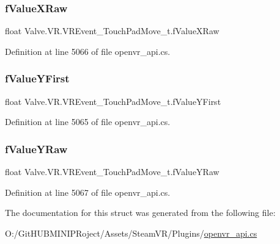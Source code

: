 \subsubsection{\texorpdfstring{fValueXRaw}{fValueXRaw}}
{\footnotesize\ttfamily float Valve.\+V\+R.\+V\+R\+Event\+\_\+\+Touch\+Pad\+Move\+\_\+t.\+f\+Value\+X\+Raw}



Definition at line 5066 of file openvr\+\_\+api.\+cs.

\mbox{\label{struct_valve_1_1_v_r_1_1_v_r_event___touch_pad_move__t_afbf018022c69ddc20dc3e64776a7073d}} 
\subsubsection{\texorpdfstring{fValueYFirst}{fValueYFirst}}
{\footnotesize\ttfamily float Valve.\+V\+R.\+V\+R\+Event\+\_\+\+Touch\+Pad\+Move\+\_\+t.\+f\+Value\+Y\+First}



Definition at line 5065 of file openvr\+\_\+api.\+cs.

\mbox{\label{struct_valve_1_1_v_r_1_1_v_r_event___touch_pad_move__t_a80c16bce15dca832a200f1c67333f5ee}} 
\subsubsection{\texorpdfstring{fValueYRaw}{fValueYRaw}}
{\footnotesize\ttfamily float Valve.\+V\+R.\+V\+R\+Event\+\_\+\+Touch\+Pad\+Move\+\_\+t.\+f\+Value\+Y\+Raw}



Definition at line 5067 of file openvr\+\_\+api.\+cs.



The documentation for this struct was generated from the following file\+:\begin{DoxyCompactItemize}
\item 
O\+:/\+Git\+H\+U\+B\+M\+I\+N\+I\+P\+Roject/\+Assets/\+Steam\+V\+R/\+Plugins/\mbox{\hyperlink{openvr__api_8cs}{openvr\+\_\+api.\+cs}}\end{DoxyCompactItemize}
